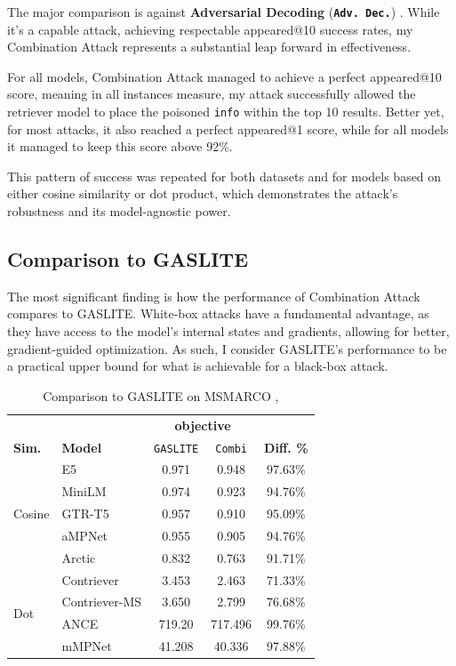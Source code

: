 \documentclass[a4paper, sigconf]{acmart}
\begin{document}
The major comparison is against \textbf{Adversarial Decoding} (\textbf{\texttt{Adv. Dec.}}) \cite{zhang2025-adv}. While it's a capable attack, achieving respectable appeared@10 success rates, my Combination Attack represents a substantial leap forward in effectiveness. 

For all models, Combination Attack managed to achieve a perfect appeared@10 score, meaning in all instances measure, my attack successfully allowed the retriever model to place the poisoned \texttt{info} within the top 10 results. Better yet, for most attacks, it also reached a perfect appeared@1 score, while for all models it managed to keep this score above 92\%. 

This pattern of success was repeated for both datasets and for models based on either cosine similarity or dot product, which demonstrates the attack's robustness and its model-agnostic power. 


\subsection{Comparison to GASLITE}

The most significant finding is how the performance of Combination Attack compares to GASLITE. White-box attacks have a fundamental advantage, as they have access to the model's internal states and gradients, allowing for better, gradient-guided optimization. As such, I consider GASLITE's performance to be a practical upper bound for what is achievable for a black-box attack. 

\begin{table}[h!]
\caption{Comparison to GASLITE on MSMARCO \cite{bentov2024},\cite{bajaj2018}}
\label{table:gaslite}
  \begin{tabular}{ll|cc|c}
  \hline
  & & \multicolumn{2}{c|}{\textbf{objective}} & \\
  \textbf{Sim.} & \textbf{Model} & \texttt{GASLITE} & \texttt{Combi} & \textbf{Diff. \%} \\
  \hline
  \multirow{5}{*}{Cosine} & E5 & 0.971 & 0.948 & 97.63\% \\
  \hhline{~----}
  & MiniLM & 0.974 & 0.923 & 94.76\% \\
  \hhline{~----}
  & GTR-T5 & 0.957 & 0.910 & 95.09\% \\
  \hhline{~----}
  & aMPNet & 0.955 & 0.905 & 94.76\% \\
  \hhline{~----}
  & Arctic & 0.832 & 0.763 & 91.71\% \\
  \hline
  \multirow{4}{*}{Dot} & Contriever & 3.453 & 2.463 & 71.33\% \\
  \hhline{~----}
  & Contriever-MS & 3.650 & 2.799 & 76.68\% \\
  \hhline{~----}
  & ANCE & 719.20 & 717.496 & 99.76\% \\
  \hhline{~----}
  & mMPNet & 41.208 & 40.336 & 97.88\% \\
  \hline
 \end{tabular}
 \end{table}
 
\end{document}
